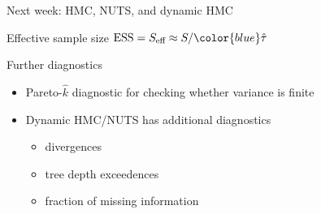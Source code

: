 \documentclass[finnish,english,t]{beamer}
\def\eff{\text{eff}}
\def\ESS{\text{ESS}}
\begin{document}
\begin{frame}
  
   {\Large\color{navyblue} Next week: HMC, NUTS, and dynamic HMC}

   Effective sample size $\ESS = S_\eff \approx S/{\color{blue}\hat{\tau}}$\\
   
\end{frame}

\begin{frame}
   
   {\Large\color{navyblue} Further diagnostics}

   \begin{itemize}
   \item Pareto-$\hat{k}$ diagnostic for checking whether variance is
     finite
   \item Dynamic HMC/NUTS has additional diagnostics
     \begin{itemize}
     \item divergences
     \item tree depth exceedences
     \item fraction of missing information
     \end{itemize}
   \end{itemize}
   
 \end{frame}
\end{document}
